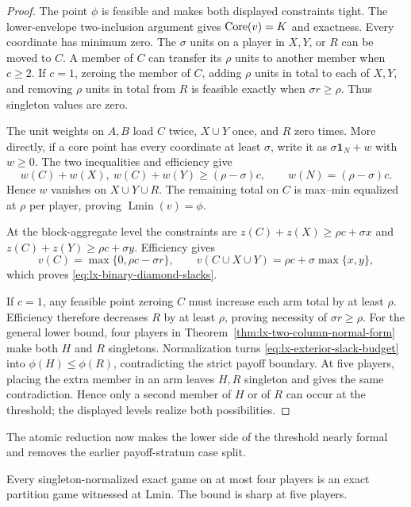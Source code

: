 \begin{proof}
The point $\phi$ is feasible and makes both displayed constraints tight.
The lower-envelope two-inclusion argument gives $\operatorname{Core}(v)=K$ and exactness.
Every coordinate has minimum zero. The $\sigma$ units on a player in $X,Y$,
or $R$ can be moved to $C$. A member of $C$ can transfer its $\rho$ units to
another member when $c\geq2$. If $c=1$, zeroing the member of $C$, adding
$\rho$ units in total to each of $X,Y$, and removing $\rho$ units in total
from $R$ is feasible exactly when $\sigma r\geq\rho$.
Thus singleton values are zero.

The unit weights on $A,B$ load $C$ twice, $X\cup Y$ once, and $R$ zero
times. More directly, if a core point has every coordinate at least $\sigma$,
write it as $\sigma\mathbf1_N+w$ with $w\geq0$. The two inequalities and
efficiency give
\[
 w(C)+w(X),\ w(C)+w(Y)\geq(\rho-\sigma)c,
 \qquad w(N)=(\rho-\sigma)c.
\]
Hence $w$ vanishes on $X\cup Y\cup R$. The remaining total on $C$ is
max--min equalized at $\rho$ per player, proving $\operatorname{Lmin}(v)=\phi$.

At the block-aggregate level the constraints are
$z(C)+z(X)\geq\rho c+\sigma x$ and
$z(C)+z(Y)\geq\rho c+\sigma y$. Efficiency gives
\[
 v(C)=\max\{0,\rho c-\sigma r\},\qquad
 v(C\cup X\cup Y)=\rho c+\sigma\max\{x,y\},
\]
which proves \eqref{eq:lx-binary-diamond-slacks}.

If $c=1$, any feasible point zeroing $C$ must increase each arm total by at
least $\rho$. Efficiency therefore decreases $R$ by at least $\rho$, proving
necessity of $\sigma r\geq\rho$. For the general lower bound, four players in
Theorem~\ref{thm:lx-two-column-normal-form} make both $H$ and $R$ singletons.
Normalization turns \eqref{eq:lx-exterior-slack-budget} into
$\phi(H)\leq\phi(R)$, contradicting the strict payoff boundary. At five
players, placing the extra member in an arm leaves $H,R$ singleton and gives
the same contradiction. Hence only a second member of $H$ or of $R$ can
occur at the threshold; the displayed levels realize both possibilities.
\end{proof}

The atomic reduction now makes the lower side of the threshold nearly
formal and removes the earlier payoff-stratum case split.

\begin{corollary}
\label{cor:lx-circuit-four-five-threshold}
Every singleton-normalized exact game on at most four players is an exact
partition game witnessed at Lmin.  The bound is sharp at five players.
\end{corollary}

